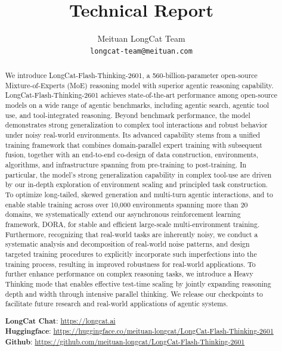 \documentclass{article}
\title{\longcat Technical Report}
\author{ Meituan LongCat Team \\
	\texttt{longcat-team@meituan.com} \\
}
\newcommand{\longcat}{LongCat-Flash-Thinking-2601\xspace}
\begin{document}
\maketitle

\begin{abstract}

We introduce \longcat, a 560-billion-parameter open-source Mixture-of-Experts (MoE) reasoning model with superior agentic reasoning capability.
\longcat achieves state-of-the-art performance among open-source models on a wide range of agentic benchmarks, including agentic search, agentic tool use, and tool-integrated reasoning.
Beyond benchmark performance, the model demonstrates strong generalization to complex tool interactions and robust behavior under noisy real-world environments.
Its advanced capability stems from a unified training framework that combines domain-parallel expert training with subsequent fusion, together with an end-to-end co-design of data construction, environments, algorithms, and infrastructure spanning from pre-training to post-training.
In particular, the model’s strong generalization capability in complex tool-use are driven by our in-depth exploration of environment scaling and principled task construction.
To optimize long-tailed, skewed generation and multi-turn agentic interactions, and to enable stable training across over 10,000 environments spanning more than 20 domains, we systematically extend our asynchronous reinforcement learning framework, DORA, for stable and efficient large-scale multi-environment training.
Furthermore, recognizing that real-world tasks are inherently noisy, we conduct a systematic analysis and decomposition of real-world noise patterns, and design targeted training procedures to explicitly incorporate such imperfections into the training process, resulting in improved robustness for real-world applications.
To further enhance performance on complex reasoning tasks, we introduce a Heavy Thinking mode that enables effective test-time scaling by jointly expanding reasoning depth and width through intensive parallel thinking.
We release our checkpoints to facilitate future research and real-world applications of agentic systems.

\textbf{LongCat Chat}: \href{https://longcat.ai}{https://longcat.ai} \\
\textbf{Huggingface}: \href{https://huggingface.co/meituan-longcat/LongCat-Flash-Thinking-2601}{https://huggingface.co/meituan-longcat/LongCat-Flash-Thinking-2601} \\
\textbf{Github}: \href{https://github.com/meituan-longcat/LongCat-Flash-Thinking-2601}{https://github.com/meituan-longcat/LongCat-Flash-Thinking-2601} \\

\end{abstract}
\end{document}
